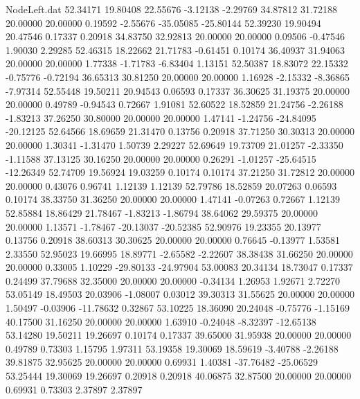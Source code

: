 \begin{filecontents}{NodeLeft.dat}
  52.34171   19.80408   22.55676    -3.12138   -2.29769   34.87812   31.72188   20.00000   20.00000    0.19592   -2.55676  -35.05085  -25.80144
  52.39230   19.90494   20.47546     0.17337    0.20918   34.83750   32.92813   20.00000   20.00000    0.09506   -0.47546    1.90030    2.29285
  52.46315   18.22662   21.71783    -0.61451    0.10174   36.40937   31.94063   20.00000   20.00000    1.77338   -1.71783   -6.83404    1.13151
  52.50387   18.83072   22.15332    -0.75776   -0.72194   36.65313   30.81250   20.00000   20.00000    1.16928   -2.15332   -8.36865   -7.97314
  52.55448   19.50211   20.94543     0.06593    0.17337   36.30625   31.19375   20.00000   20.00000    0.49789   -0.94543    0.72667    1.91081
  52.60522   18.52859   21.24756    -2.26188   -1.83213   37.26250   30.80000   20.00000   20.00000    1.47141   -1.24756  -24.84095  -20.12125
  52.64566   18.69659   21.31470     0.13756    0.20918   37.71250   30.30313   20.00000   20.00000    1.30341   -1.31470    1.50739    2.29227
  52.69649   19.73709   21.01257    -2.33350   -1.11588   37.13125   30.16250   20.00000   20.00000    0.26291   -1.01257  -25.64515  -12.26349
  52.74709   19.56924   19.03259     0.10174    0.10174   37.21250   31.72812   20.00000   20.00000    0.43076    0.96741    1.12139    1.12139
  52.79786   18.52859   20.07263     0.06593    0.10174   38.33750   31.36250   20.00000   20.00000    1.47141   -0.07263    0.72667    1.12139
  52.85884   18.86429   21.78467    -1.83213   -1.86794   38.64062   29.59375   20.00000   20.00000    1.13571   -1.78467  -20.13037  -20.52385
  52.90976   19.23355   20.13977     0.13756    0.20918   38.60313   30.30625   20.00000   20.00000    0.76645   -0.13977    1.53581    2.33550
  52.95023   19.66995   18.89771    -2.65582   -2.22607   38.38438   31.66250   20.00000   20.00000    0.33005    1.10229  -29.80133  -24.97904
  53.00083   20.34134   18.73047     0.17337    0.24499   37.79688   32.35000   20.00000   20.00000   -0.34134    1.26953    1.92671    2.72270
  53.05149   18.49503   20.03906    -1.08007    0.03012   39.30313   31.55625   20.00000   20.00000    1.50497   -0.03906  -11.78632    0.32867
  53.10225   18.36090   20.24048    -0.75776   -1.15169   40.17500   31.16250   20.00000   20.00000    1.63910   -0.24048   -8.32397  -12.65138
  53.14280   19.50211   19.26697     0.10174    0.17337   39.65000   31.95938   20.00000   20.00000    0.49789    0.73303    1.15795    1.97311
  53.19358   19.30069   18.59619    -3.40788   -2.26188   39.81875   32.95625   20.00000   20.00000    0.69931    1.40381  -37.76482  -25.06529
  53.25444   19.30069   19.26697     0.20918    0.20918   40.06875   32.87500   20.00000   20.00000    0.69931    0.73303    2.37897    2.37897

\end{filecontents}
